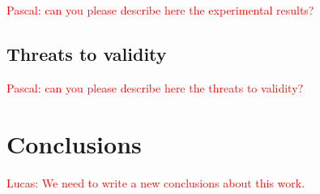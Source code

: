 \documentclass[twocolumn]{autart}    %
\begin{document}
\textcolor{red}{Pascal: can you please describe here the experimental results?}

\subsection{Threats to validity}
\label{exp:threats-to-validity}

\textcolor{red}{Pascal: can you please describe here the threats to validity?}

\section{Conclusions}
\label{sec:conclusions}

\textcolor{red}{Lucas: We need to write a new conclusions about this work.}





\end{document}
